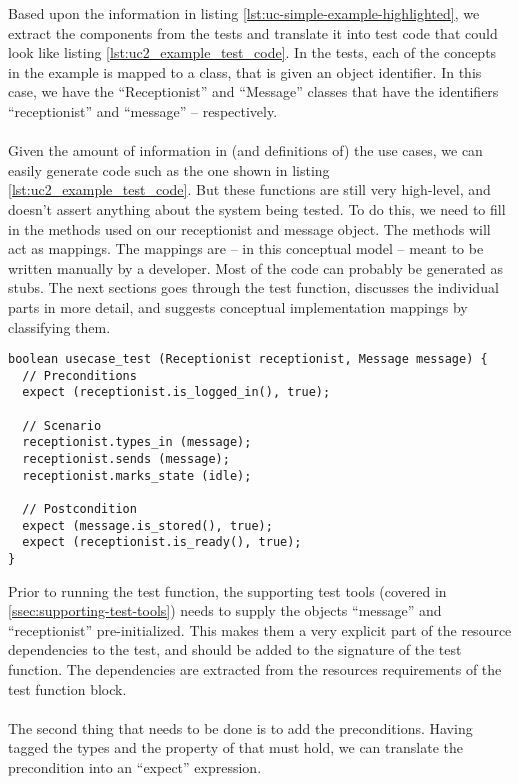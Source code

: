 Based upon the information in listing \ref{lst:uc-simple-example-highlighted}, we extract the components from the tests and translate it into test code that could look like listing \ref{lst:uc2_example_test_code}. In the tests, each of the concepts in the example is mapped to a class, that is given an object identifier. In this case, we have the ``Receptionist'' and ``Message'' classes that have the identifiers ``receptionist'' and ``message'' -- respectively.\\\\
Given the amount of information in (and definitions of) the use cases, we can easily generate code such as the one shown in listing \ref{lst:uc2_example_test_code}. But these functions are still very high-level, and doesn't assert anything about the system being tested. To do this, we need to fill in the methods used on our receptionist and message object. The methods will act as mappings. The mappings are -- in this conceptual model -- meant to be written manually by a developer. Most of the code can probably be generated as stubs. The next sections goes through the test function, discusses the individual parts in more detail, and suggests conceptual implementation mappings by classifying them.
\begin{lstlisting}[style=Dart, caption=Suggested structure of generated test case,label={lst:uc2_example_test_code}]
boolean usecase_test (Receptionist receptionist, Message message) {
  // Preconditions
  expect (receptionist.is_logged_in(), true);

  // Scenario
  receptionist.types_in (message);
  receptionist.sends (message);
  receptionist.marks_state (idle);
  
  // Postcondition
  expect (message.is_stored(), true);
  expect (receptionist.is_ready(), true);
}
\end{lstlisting}
Prior to running the test function, the supporting test tools (covered in \ref{ssec:supporting-test-tools}) needs to supply the objects ``message'' and ``receptionist'' pre-initialized. This makes them a very explicit part of the resource dependencies to the test, and should be added to the signature of the test function. The dependencies are extracted from the resources requirements of the test function block.\\\\
The second thing that needs to be done is to add the preconditions. Having tagged the types and the property of that must hold, we can translate the precondition into an ``expect'' expression.\\\\
